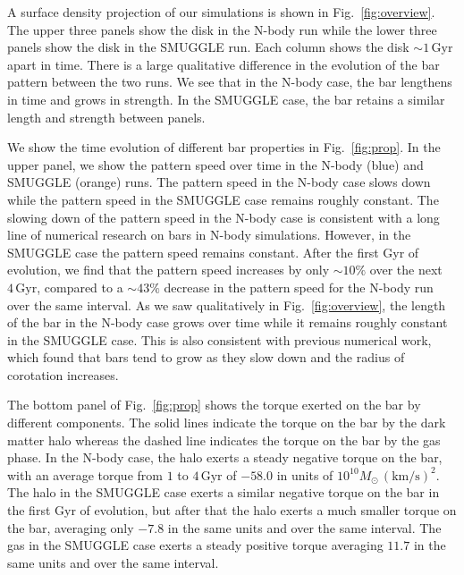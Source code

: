 \documentclass{natureprintstyle}
\begin{document}
A surface density projection of our simulations is shown in
Fig.~\ref{fig:overview}. The upper three panels show the disk in the N-body
run while the lower three panels show the disk in the SMUGGLE run. Each column
shows the disk $\sim1\,\textrm{Gyr}$ apart in time. There is a large
qualitative difference in the evolution of the bar pattern between the two
runs. We see that in the N-body case, the bar lengthens in time and grows in
strength. In the SMUGGLE case, the bar retains a similar length and strength
between panels.

We show the time evolution of different bar properties in Fig.~\ref{fig:prop}.
In the upper panel, we show the pattern speed over time in the N-body (blue)
and SMUGGLE (orange) runs. The pattern speed in the N-body case slows down
while the pattern speed in the SMUGGLE case remains roughly constant. The
slowing down of the pattern speed in the N-body case is consistent with a long
line of numerical research on bars in N-body
simulations.\cite{1992ApJ...400...80H, 2000ApJ...543..704D,
2002MNRAS.330...35A, 2002ApJ...569L..83A, 2003MNRAS.341.1179A,
2003MNRAS.346..251O, 2005MNRAS.363..991H, 2006ApJ...637..214M,
2007MNRAS.375..460W, 2009ApJ...697..293D} However, in the SMUGGLE case the
pattern speed remains constant. After the first Gyr of evolution, we find that
the pattern speed increases by only $\sim10\%$ over the next
$4\,\textrm{Gyr}$, compared to a $\sim43\%$ decrease in the pattern speed for
the N-body run over the same interval. As we saw qualitatively in
Fig.~\ref{fig:overview}, the length of the bar in the N-body case grows over
time while it remains roughly constant in the SMUGGLE case. This is also
consistent with previous numerical work, which found that bars tend to grow as
they slow down and the radius of corotation
increases.\cite{2000ApJ...543..704D, 2003MNRAS.341.1179A}

The bottom panel of Fig.~\ref{fig:prop} shows the torque exerted on the bar by
different components. The solid lines indicate the torque on the bar by the
dark matter halo whereas the dashed line indicates the torque on the bar by
the gas phase. In the N-body case, the halo exerts a steady negative torque on
the bar, with an average torque from $1$ to $4\,\textrm{Gyr}$ of $-58.0$ in
units of $10^{10}M_{\odot}\,(\textrm{km}/\textrm{s})^2$. The halo in the
SMUGGLE case exerts a similar negative torque on the bar in the first Gyr of
evolution, but after that the halo exerts a much smaller torque on the bar,
averaging only $-7.8$ in the same units and over the same interval. The gas in
the SMUGGLE case exerts a steady positive torque averaging $11.7$ in the same
units and over the same interval.
\end{document}
